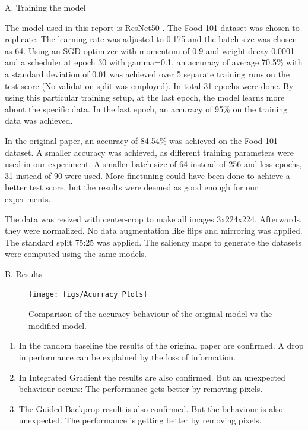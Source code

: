 A. Training the model

The model used in this report is ResNet50 \cite{he2015deep}. The Food-101 \cite{bossard14} dataset was chosen to replicate. The learning rate was adjusted to 0.175 and the batch size was chosen as 64. Using an SGD optimizer with momentum of 0.9 and weight decay 0.0001 and a scheduler at epoch 30 with gamma=0.1, an accuracy of average 70.5\% with a standard deviation of 0.01 was achieved over 5 separate training runs on the test score (No validation split was employed). In total 31 epochs were done. 
By using this particular training setup, at the last epoch, the model learns more about the specific data. In the last epoch, an accuracy of 95\% on the training data was achieved.

In the original paper, an accuracy of 84.54\% was achieved on the Food-101 dataset. A smaller accuracy was achieved, as different training parameters were used in our experiment. A smaller batch size of 64 instead of 256 and less epochs, 31 instead of 90 were used. More finetuning could have been done to achieve a better test score, but the results were deemed as good enough for our experiments.

The data was resized with center-crop to make all images 3x224x224. Afterwards, they were normalized. No data augmentation like flips and mirroring was applied. The standard split 75:25 was applied. The saliency maps to generate the datasets were computed using the same models.

B. Results

\begin{figure}[h!]
	\centering
	\texttt{[image: figs/Acurracy Plots]}
	\caption {Comparison of the accuracy behaviour of the original model vs the modified model.}
	\label{fig:Sanity}
\end{figure}

\begin{enumerate}
	\item In the random baseline the results of the original paper are confirmed. A drop in performance can be explained by the loss of information.
	\item In Integrated Gradient the results are also confirmed. But an unexpected behaviour occurs: The performance gets better by removing pixels. 
	\item The Guided Backprop result is also confirmed. But the behaviour is also unexpected. The performance is getting better by removing pixels.
\end{enumerate}



